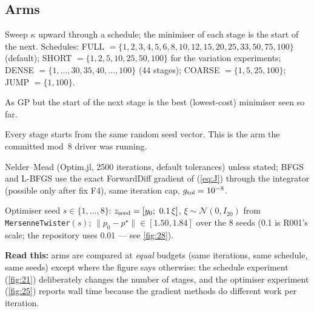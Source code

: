 \documentclass[10pt]{article}
\newcommand{\pstar}{p^\star}
\newcommand{\readthis}[1]{\textbf{Read this:} #1}
\begin{document}
\subsection{Arms}
\begin{description}[leftmargin=1.6em, itemsep=1pt]
\item[GP (guess propagation)] Sweep $\kappa$ upward through a schedule; the minimiser of each stage is the start of the next. Schedules: FULL $=\{1,2,3,4,5,6,8,10,12,15,20,25,33,50,75,\allowbreak 100\}$ (default); SHORT $=\{1,2,5,10,25,50,100\}$ for the variation experiments; DENSE $=\{1,\dots,30,35,40,\dots,100\}$ (44 stages); COARSE $=\{1,5,25,100\}$; JUMP $=\{1,100\}$.
\item[best-GP] As GP but the start of the next stage is the best (lowest-cost) minimiser seen so far.
\item[control (no propagation)] Every stage starts from the same random seed vector. This is the arm the committed mod~8 driver was running.
\item[optimiser] Nelder--Mead (Optim.jl, 2500 iterations, default tolerances) unless stated; BFGS and L-BFGS use the exact ForwardDiff gradient of (\ref{eq:J}) through the integrator (possible only after fix F4), same iteration cap, $g_{\rm tol}=10^{-8}$.
\item[seed] Optimiser seed $s\in\{1,\dots,8\}$: $z_{\rm seed}=[y_0;\ 0.1\,\xi]$, $\xi\sim\mathcal N(0,I_{20})$ from \texttt{MersenneTwister}$(s)$; $\lVert p_0-\pstar\rVert\in[1.50,1.84]$ over the 8 seeds (0.1 is R001's scale; the repository uses 0.01 --- see \ref{fig:28}).
\end{description}
\readthis{arms are compared at \emph{equal} budgets (same iterations, same schedule, same seeds) except where the figure says otherwise: the schedule experiment (\ref{fig:21}) deliberately changes the number of stages, and the optimiser experiment (\ref{fig:25}) reports wall time because the gradient methods do different work per iteration.}
\end{document}
